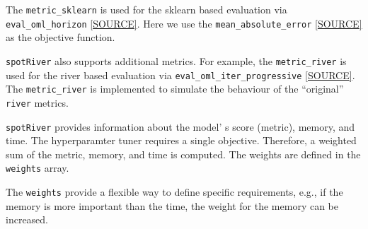 \documentclass[
  letterpaper,
  DIV=11,
  numbers=noendperiod]{scrreprt}
\begin{document}
The \texttt{metric\_sklearn} is used for the sklearn based evaluation
via \texttt{eval\_oml\_horizon}
\href{https://github.com/sequential-parameter-optimization/spotRiver/blob/main/src/spotRiver/evaluation/eval_bml.py}{{[}SOURCE{]}}.
Here we use the \texttt{mean\_absolute\_error}
\href{https://scikit-learn.org/stable/modules/generated/sklearn.metrics.mean_absolute_error.html}{{[}SOURCE{]}}
as the objective function.

\begin{tcolorbox}[enhanced jigsaw, rightrule=.15mm, coltitle=black, title=\textcolor{quarto-callout-note-color}{\faInfo}\hspace{0.5em}{Note: Additional metrics}, opacitybacktitle=0.6, bottomrule=.15mm, opacityback=0, left=2mm, colback=white, leftrule=.75mm, colframe=quarto-callout-note-color-frame, colbacktitle=quarto-callout-note-color!10!white, toprule=.15mm, toptitle=1mm, bottomtitle=1mm, titlerule=0mm, breakable, arc=.35mm]

\texttt{spotRiver} also supports additional metrics. For example, the
\texttt{metric\_river} is used for the river based evaluation via
\texttt{eval\_oml\_iter\_progressive}
\href{https://github.com/sequential-parameter-optimization/spotRiver/blob/main/src/spotRiver/evaluation/eval_oml.py}{{[}SOURCE{]}}.
The \texttt{metric\_river} is implemented to simulate the behaviour of
the ``original'' \texttt{river} metrics.

\end{tcolorbox}

\texttt{spotRiver} provides information about the model' s score
(metric), memory, and time. The hyperparamter tuner requires a single
objective. Therefore, a weighted sum of the metric, memory, and time is
computed. The weights are defined in the \texttt{weights} array.

\begin{tcolorbox}[enhanced jigsaw, rightrule=.15mm, coltitle=black, title=\textcolor{quarto-callout-note-color}{\faInfo}\hspace{0.5em}{Note: Weights}, opacitybacktitle=0.6, bottomrule=.15mm, opacityback=0, left=2mm, colback=white, leftrule=.75mm, colframe=quarto-callout-note-color-frame, colbacktitle=quarto-callout-note-color!10!white, toprule=.15mm, toptitle=1mm, bottomtitle=1mm, titlerule=0mm, breakable, arc=.35mm]

The \texttt{weights} provide a flexible way to define specific
requirements, e.g., if the memory is more important than the time, the
weight for the memory can be increased.

\end{tcolorbox}
\end{document}
